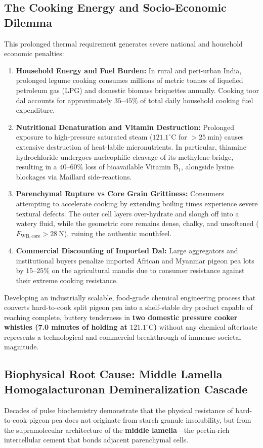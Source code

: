 \documentclass[10pt,a4paper]{article}
\begin{document}
\subsection{The Cooking Energy and Socio-Economic Dilemma}
This prolonged thermal requirement generates severe national and household economic penalties:
\begin{enumerate}[leftmargin=1.5em]
    \item \textbf{Household Energy and Fuel Burden:} In rural and peri-urban India, prolonged legume cooking consumes millions of metric tonnes of liquefied petroleum gas (LPG) and domestic biomass briquettes annually. Cooking toor dal accounts for approximately $35\text{--}45\%$ of total daily household cooking fuel expenditure.
    \item \textbf{Nutritional Denaturation and Vitamin Destruction:} Prolonged exposure to high-pressure saturated steam ($121.1^\circ\mathrm{C}$ for $> 25\ \mathrm{min}$) causes extensive destruction of heat-labile micronutrients. In particular, thiamine hydrochloride undergoes nucleophilic cleavage of its methylene bridge, resulting in a $40\text{--}60\%$ loss of bioavailable Vitamin $\mathrm{B}_1$, alongside lysine blockages via Maillard side-reactions.
    \item \textbf{Parenchymal Rupture vs Core Grain Grittiness:} Consumers attempting to accelerate cooking by extending boiling times experience severe textural defects. The outer cell layers over-hydrate and slough off into a watery fluid, while the geometric core remains dense, chalky, and unsoftened ($F_{\mathrm{WB,core}} > 28\ \mathrm{N}$), ruining the authentic mouthfeel.
    \item \textbf{Commercial Discounting of Imported Dal:} Large aggregators and institutional buyers penalize imported African and Myanmar pigeon pea lots by $15\text{--}25\%$ on the agricultural mandis due to consumer resistance against their extreme cooking resistance.
\end{enumerate}

Developing an industrially scalable, food-grade chemical engineering process that converts hard-to-cook split pigeon pea into a shelf-stable dry product capable of reaching complete, buttery tenderness in \textbf{two domestic pressure cooker whistles (7.0 minutes of holding at $121.1^\circ\mathrm{C}$)} without any chemical aftertaste represents a technological and commercial breakthrough of immense societal magnitude.

\subsection{Biophysical Root Cause: Middle Lamella Homogalacturonan Demineralization Cascade}
Decades of pulse biochemistry demonstrate that the physical resistance of hard-to-cook pigeon pea does not originate from starch granule insolubility, but from the supramolecular architecture of the \textbf{middle lamella}---the pectin-rich intercellular cement that bonds adjacent parenchymal cells.
\end{document}
